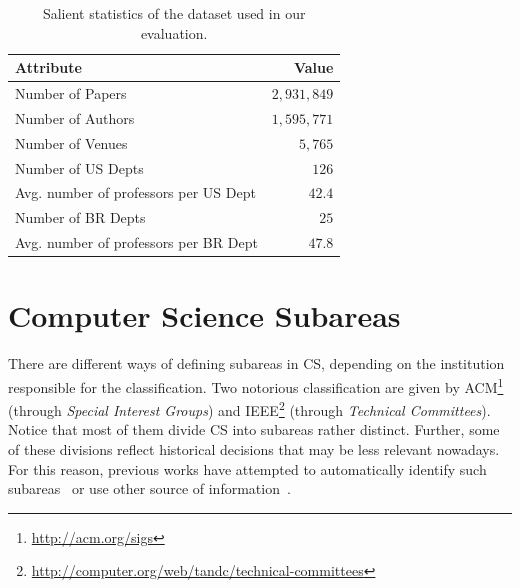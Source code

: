 \documentclass[msc]{ppgccufmg}
\begin{document}
\begin{table}[htbp]
\centering
\caption{Salient statistics of the dataset used in our evaluation.}
\label{tab:stats}
\begin{tabular}{l|r}
\toprule
Attribute & Value \\ \hline
Number of Papers         & $2{,}931{,}849$                 \\
Number of Authors        & $1{,}595{,}771$                 \\
Number of Venues         & $5{,}765$                     \\
Number of US Depts		 & $126$                       \\
Avg. number of professors per US Dept	&	$42.4$				              \\ %
Number of BR Depts    							            & $25$                        \\
Avg. number of professors per BR Dept	&	$47.8$				              \\ %
\bottomrule
\end{tabular}
\end{table}


\section{Computer Science Subareas}

There are different ways of defining subareas in CS, %
depending on the institution responsible for the classification. Two notorious classification are given by ACM\footnote{\url{http://acm.org/sigs}} (through \textit{Special Interest Groups}) and IEEE\footnote{\url{http://computer.org/web/tandc/technical-committees}} (through \textit{Technical Committees}). 
Notice that most of them divide CS into subareas rather distinct. Further, some of these divisions reflect historical decisions that may be less relevant nowadays. For this reason, 
previous works have attempted to automatically identify such subareas~\citep{wainer13} or use other source of information~\citep{hoonlor13}.

\end{document}
